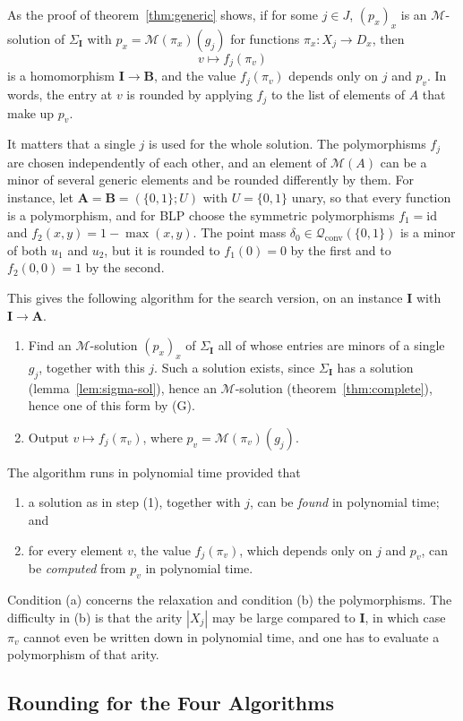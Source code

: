 \documentclass[11pt]{article}
\theoremstyle{plain}
\theoremstyle{definition}
\newcommand{\id}{\mathrm{id}}
\newcommand{\bA}{\mathbf{A}}
\newcommand{\bB}{\mathbf{B}}
\newcommand{\bI}{\mathbf{I}}
\newcommand{\M}{\mathscr{M}}
\newcommand{\Qc}{\mathscr{Q}_{\mathrm{conv}}}
\begin{document}
As the proof of theorem~\ref{thm:generic} shows, if for some $j \in J$, $(p_x)_x$ is an $\M$-solution of $\Sigma_{\bI}$ with $p_x=\M(\pi_x)(g_j)$ for functions $\pi_x\colon X_j\to D_x$, then
\[
v\mapsto f_j(\pi_v)
\]
is a homomorphism $\bI\to\bB$, and the value $f_j(\pi_v)$ depends only on $j$ and $p_v$. In words, the entry at $v$ is rounded by applying $f_j$ to the list of elements of $A$ that make up $p_v$.

It matters that a single $j$ is used for the whole solution. The polymorphisms $f_j$ are chosen independently of each other, and an element of $\M(A)$ can be a minor of several generic elements and be rounded differently by them. For instance, let $\bA=\bB=(\{0,1\};U)$ with $U=\{0,1\}$ unary, so that every function is a polymorphism, and for BLP choose the symmetric polymorphisms $f_1=\id$ and $f_2(x,y)=1-\max(x,y)$. The point mass $\delta_0\in\Qc(\{0,1\})$ is a minor of both $u_1$ and $u_2$, but it is rounded to $f_1(0)=0$ by the first and to $f_2(0,0)=1$ by the second.

This gives the following algorithm for the search version, on an instance $\bI$ with $\bI\to\bA$.
\begin{enumerate}[label=(\arabic*)]
  \item Find an $\M$-solution $(p_x)_x$ of $\Sigma_{\bI}$ all of whose entries are minors of a single $g_j$, together with this $j$. Such a solution exists, since $\Sigma_{\bI}$ has a solution (lemma~\ref{lem:sigma-sol}), hence an $\M$-solution (theorem~\ref{thm:complete}), hence one of this form by (G).
  \item Output $v\mapsto f_j(\pi_v)$, where $p_v=\M(\pi_v)(g_j)$.
\end{enumerate}
The algorithm runs in polynomial time provided that
\begin{enumerate}[label=(\alph*)]
  \item a solution as in step (1), together with $j$, can be \emph{found} in polynomial time; and
  \item for every element $v$, the value $f_j(\pi_v)$, which depends only on $j$ and $p_v$, can be \emph{computed} from $p_v$ in polynomial time.
\end{enumerate}
Condition (a) concerns the relaxation and condition (b) the polymorphisms. The difficulty in (b) is that the arity $|X_j|$ may be large compared to $\bI$, in which case $\pi_v$ cannot even be written down in polynomial time, and one has to evaluate a polymorphism of that arity.

\subsection{Rounding for the Four Algorithms}\label{sec:rounding}
\end{document}
